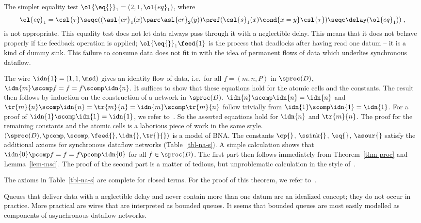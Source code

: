 \documentclass[fleqn]{llncs}
\begin{document}
The simpler equality test $\ol{\eq{}}_1 = (2,1,\ol{eq}_1)$, where
$$
\ol{eq}_1 =
\csl{\tau} \seqc
((\asl{er}_1(x) \parc \asl{er}_2(y)) \pref
 (\csl{s}_1(x) \cond{x = y} \csl{\tau}) \seqc \delay(\ol{eq}_1))\;,
$$
is not appropriate.
This equality test does not let data always pass through it with a
neglectible delay.
This means that it does not behave properly if the feedback operation
is applied; $\ol{\eq{}}_1\feed{1}$ is the process that deadlocks after
having read one datum -- it is a kind of dummy sink.
This failure to consume data does not fit in with the idea of permanent
flows of data which underlies synchronous dataflow.

\blem
\label{lem-msd}
The wire $\idn{1} = (1,1,\msd)$ gives an identity flow of data, i.e.\
for all $f = (m,n,P)$ in $\sproc(D)$,
$\idn{m} \scomp f = f = f \scomp \idn{n}$.
\elem
\bproof
It suffices to show that these equations hold for the atomic cells and
the constants.
The result then follows by induction on the construction of a network
in $\sproc(D)$.
$\idn{n} \scomp \idn{n} = \idn{n}$ and
$\tr{m}{n} \scomp \idn{n} = \tr{m}{n} = \idn{m} \scomp \tr{m}{n}$ follow
trivially from $\idn{1} \scomp \idn{1} = \idn{1}$.
For a proof of $\idn{1} \scomp \idn{1} = \idn{1}$, we refer
to~\cite{BB95c}.
So the asserted equations hold for $\idn{n}$ and $\tr{m}{n}$.
The proof for the remaining constants and the atomic cells is a
laborious piece of work in the same style.
\eproof
\bthm
\label{thm-sproc}
$(\sproc(D),\pcomp,\scomp,\feed{},\idn{},\tr{}{})$ is a model of BNA.
The constants $\cp{}$, $\ssink{}$, $\eq{}$, $\asour{}$ satisfy the 
additional axioms for synchronous dataflow networks 
(Table~\ref{tbl-na-s}).
\ethm
\bproof
A simple calculation shows that
$\idn{0} \pcomp f = f = f \pcomp \idn{0}$ for all $f \in \sproc(D)$.
The first part then follows immediately from Theorem~\ref{thm-proc} and
Lemma~\ref{lem-msd}.
The proof of the second part is a matter of tedious, but unproblematic
calculation in the style of~\cite{BB95c}.
\eproof

\bthm
\label{thm-sproc-complete}
The axioms in Table~\ref{tbl-na-s} are complete for closed terms.
\ethm
\bproof
For the proof of this theorem, we refer to~\cite{BS95a}.
\eproof

Queues that deliver data with a neglectible delay and never contain
more than one datum are an idealized concept; they do not occur in
practice.
More practical are wires that are interpreted as bounded queues.
It seems that bounded queues are most easily modelled as components
of asynchronous dataflow networks.
\end{document}
